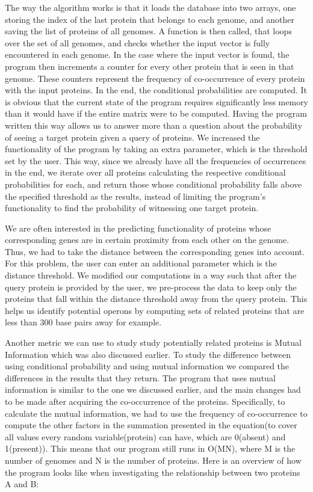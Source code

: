 \documentclass{ucetd}
\begin{document}
The way the algorithm works is that it loads the database into two arrays, one storing the index of the last protein that belongs to each genome, and another saving the list of proteins of all genomes. A function is then called, that loops over the set of all genomes, and checks whether the input vector is fully encountered in each genome. In the case where the input vector is found, the program then increments a counter for every other protein that is seen in that genome. These counters represent the frequency of co-occurrence of every protein with the input proteins. In the end, the conditional probabilities are computed. It is obvious that the current state of the program requires significantly less memory than it would have if the entire matrix were to be computed.
Having the program written this way allows us to answer more than a question about the probability of seeing a target protein given a query of proteins. We increased the functionality of the program by taking an extra parameter, which is the threshold set by the user. This way, since we already have all the frequencies of occurrences in the end, we iterate over all proteins calculating the respective conditional probabilities for each, and return those whose conditional probability falls above the specified threshold as the results, instead of limiting the program's functionality to find the probability of witnessing one target protein.

We are often interested in the predicting functionality of proteins whose corresponding genes are in certain proximity from each other on the genome. Thus, we had to take the distance between the corresponding genes into account. For this problem, the user can enter an additional parameter which is the distance threshold. We modified our computations in a way such that after the query protein is provided by the user, we pre-process the data to keep only the proteins that fall within the distance threshold away from the query protein. This helps us identify potential operons by computing sets of related proteins that are less than 300 base pairs away for example.

Another metric we can use to study study potentially related proteins is Mutual Information which was also discussed earlier. To study the difference between using conditional probability and using mutual information we compared the differences in the results that they return. The program that uses mutual information is similar to the one we discussed earlier, and the main changes had to be made after acquiring the co-occurrence of the proteins. Specifically, to calculate the mutual information, we had to use the frequency of co-occurrence to compute the other factors in the summation presented in the equation(to cover all values every random variable(protein) can have, which are 0(absent) and 1(present)). This means that our program still runs in O(MN), where M is the number of genomes and N is the number of proteins. Here is an overview of how the program looks like when investigating the relationship between two proteins A and B: 
\end{document}
